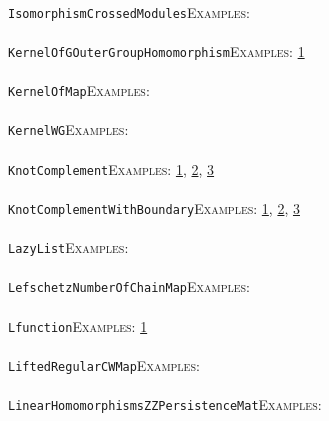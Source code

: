 \documentclass[a4paper,11pt]{report}
\begin{document}
{{ \\
 \texttt{IsomorphismCrossedModules}{\nobreakspace}{\nobreakspace}{\nobreakspace}{\nobreakspace}\textsc{Examples:} \\
 \\
 \texttt{KernelOfGOuterGroupHomomorphism}{\nobreakspace}{\nobreakspace}{\nobreakspace}{\nobreakspace}\textsc{Examples:} \href{../www/SideLinks/About/aboutCoefficientSequence.html} {1}{\nobreakspace} \\
 \\
 \texttt{KernelOfMap}{\nobreakspace}{\nobreakspace}{\nobreakspace}{\nobreakspace}\textsc{Examples:} \\
 \\
 \texttt{KernelWG}{\nobreakspace}{\nobreakspace}{\nobreakspace}{\nobreakspace}\textsc{Examples:} \\
 \\
 \texttt{KnotComplement}{\nobreakspace}{\nobreakspace}{\nobreakspace}{\nobreakspace}\textsc{Examples:} \href{tutorial/chap1.html} {1}{\nobreakspace}, \href{tutorial/chap3.html} {2}{\nobreakspace}, \href{../www/SideLinks/About/aboutCoverinSpaces.html} {3}{\nobreakspace} \\
 \\
 \texttt{KnotComplementWithBoundary}{\nobreakspace}{\nobreakspace}{\nobreakspace}{\nobreakspace}\textsc{Examples:} \href{tutorial/chap1.html} {1}{\nobreakspace}, \href{tutorial/chap3.html} {2}{\nobreakspace}, \href{../www/SideLinks/About/aboutCoverinSpaces.html} {3}{\nobreakspace} \\
 \\
 \texttt{LazyList}{\nobreakspace}{\nobreakspace}{\nobreakspace}{\nobreakspace}\textsc{Examples:} \\
 \\
 \texttt{LefschetzNumberOfChainMap}{\nobreakspace}{\nobreakspace}{\nobreakspace}{\nobreakspace}\textsc{Examples:} \\
 \\
 \texttt{Lfunction}{\nobreakspace}{\nobreakspace}{\nobreakspace}{\nobreakspace}\textsc{Examples:} \href{tutorial/chap10.html} {1}{\nobreakspace} \\
 \\
 \texttt{LiftedRegularCWMap}{\nobreakspace}{\nobreakspace}{\nobreakspace}{\nobreakspace}\textsc{Examples:} \\
 \\
 \texttt{LinearHomomorphismsZZPersistenceMat}{\nobreakspace}{\nobreakspace}{\nobreakspace}{\nobreakspace}\textsc{Examples:} \\
}}
\end{document}
